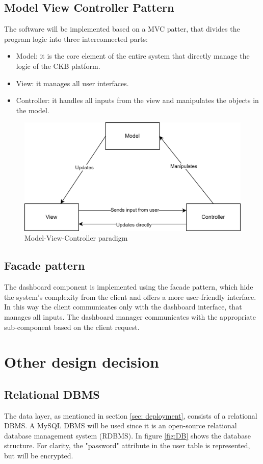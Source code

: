 \subsection*{Model View Controller Pattern}
The software will be implemented based on a MVC patter, that divides the program logic into three interconnected parts:
\begin{itemize}
    \item Model: it is the core element of the entire system that directly manage the logic of the CKB platform. 
    \item View: it manages all user interfaces.
    \item Controller: it handles all inputs from the view and manipulates the objects in the model.
\end{itemize}
\begin{figure}[h]
    \centering 
    \includegraphics[scale=0.8]{images/MVC.png}
    \caption{Model-View-Controller paradigm}
    \label{fig:MVC}
\end{figure}

\subsection*{Facade pattern}
The dashboard component is implemented using the facade pattern, which hide the system's complexity from the client and offers a more user-friendly interface.
In this way the client communicates only with the dashboard interface, that manages all inputs. The dashboard manager communicates with the appropriate sub-component based on the client request.

\clearpage
\section{Other design decision}
\subsection*{Relational DBMS}
The data layer, as mentioned in section \ref{sec: deployment}, consists of a relational DBMS. A MySQL DBMS will be used since it is an open-source relational database management system (RDBMS). \newline
In figure \ref{fig:DB} shows the database structure. \newline
For clarity, the "password" attribute in the user table is represented, but will be encrypted.


